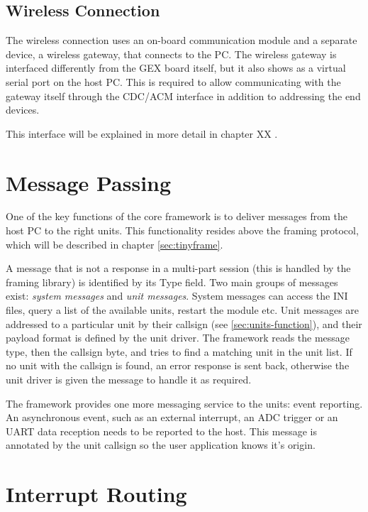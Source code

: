\subsection{Wireless Connection}

The wireless connection uses an on-board communication module and a separate device, a wireless gateway, that connects to the PC. The wireless gateway is interfaced differently from the GEX board itself, but it also shows as a virtual serial port on the host PC. This is required to allow communicating with the gateway itself through the CDC/ACM interface in addition to addressing the end devices.

This interface will be explained in more detail in chapter XX .

\section{Message Passing} \label{sec:message_passing}

One of the key functions of the core framework is to deliver messages from the host PC to the right units. This functionality resides above the framing protocol, which will be described in chapter \ref{sec:tinyframe}.

A message that is not a response in a multi-part session (this is handled by the framing library) is identified by its Type field. Two main groups of messages exist: \textit{system messages} and \textit{unit messages}. System messages can access the INI files, query a list of the available units, restart the module etc. Unit messages are addressed to a particular unit by their callsign (see \ref{sec:units-function}), and their payload format is defined by the unit driver. The framework reads the message type, then the callsign byte, and tries to find a matching unit in the unit list. If no unit with the callsign is found, an error response is sent back, otherwise the unit driver is given the message to handle it as required.

The framework provides one more messaging service to the units: event reporting. An asynchronous event, such as an external interrupt, an ADC trigger or an UART data reception needs to be reported to the host. This message is annotated by the unit callsign so the user application knows it's origin.


\section{Interrupt Routing} \label{sec:irq-routing}

